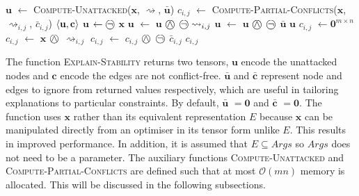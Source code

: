 \begin{algorithm}[H]
	\caption{}
	\begin{algorithmic}[1]
			\State $\mathbf{u}$ $\gets$ \textsc{Compute-Unattacked}($\mathbf{x}$, $\rightsquigarrow$, $\bar{\mathbf{u}}$)
					\State $c_{i,j}$ $\gets$ \textsc{Compute-Partial-Conflicts}($\mathbf{x}$, $\rightsquigarrow_{i,j}$, $\bar{c}_{i,j}$)
				\EndFor
			\EndFor			
			\State \Return $\langle{\mathbf{u}},{\mathbf{c}}\rangle$
		\EndFunction
			\State $\mathbf{u}$ $\gets\incircbin{\neg}$ $\mathbf{x}$
						\State $\mathbf{u}$ $\gets$ $\mathbf{u}$ $\incircbin{\land}$ $\incircbin{\neg}\rightsquigarrow_{i,j}$
					\EndIf
				\EndFor
			\EndFor
			\State $\mathbf{u}$ $\gets$ $\mathbf{u}$ $\incircbin{\land}$ $\incircbin{\neg}$ $\bar{\mathbf{u}}$
			\State \Return $\mathbf{u}$
		\EndFunction
			\State $c_{i,j}$ $\gets\mathbf{0}^{m\times n}$
				\State $c_{i,j}$ $\gets$ $\mathbf{x}$ $\incircbin{\land}$ $\rightsquigarrow_{i,j}$ 
			\EndIf
			\State $c_{i,j}$ $\gets$ $c_{i,j}$ $\incircbin{\land}$ $\incircbin{\neg}$ $\bar{c}_{i,j}$
			\State \Return $c_{i,j}$
		\EndFunction
	\end{algorithmic}
\end{algorithm}

The function \textsc{Explain-Stability} returns two tensors, $\mathbf{u}$ encode the unattacked nodes and $\mathbf{c}$ encode the edges are not conflict-free. $\bar{\mathbf{u}}$ and $\bar{\mathbf{c}}$ represent node and edges to ignore from returned values respectively, which are useful in tailoring explanations to particular constraints. By default, $\bar{\mathbf{u}}$ $=\mathbf{0}$ and $\bar{\mathbf{c}}$ $=\mathbf{0}$. The function uses $\mathbf{x}$ rather than its equivalent representation $E$ because $\mathbf{x}$ can be manipulated directly from an optimiser in its tensor form unlike $E$. This results in improved performance. In addition, it is assumed that $E\subseteq Args$ so $Args$ does not need to be a parameter.
\linespace
The auxiliary functions \textsc{Compute-Unattacked} and \textsc{Compute-Partial-Conflicts} are defined such that at most $\mathcal{O}(mn)$ memory is allocated. This will be discussed in the following subsections.

